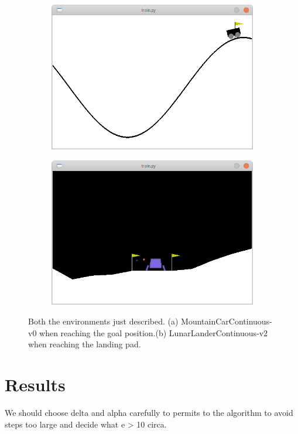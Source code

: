 \documentclass[11pt]{article}
\begin{document}
\begin{figure}[h!]
        \centering
        \begin{subfigure}[b]{0.4\linewidth}
                \includegraphics[width=\linewidth]{mountain_screen}
                \caption{}
        \end{subfigure}
        \begin{subfigure}[b]{0.4\linewidth}
                \includegraphics[width=\linewidth]{lunar_screen}
                \caption{}
        \end{subfigure}

\caption{ Both the environments just described. (a) MountainCarContinuous-v0 when reaching the goal position.(b) LunarLanderContinuous-v2 when reaching the landing pad.}
\label{fig:screens}
\end{figure}



\section{Results}
We should choose delta and alpha carefully to permits to the algorithm to avoid steps too large and decide what e > 10 circa.
\end{document}
